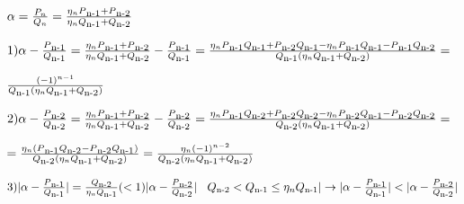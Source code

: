 \documentclass[12pt]{article}
\begin{document}
        $\alpha = \frac{P_n}{Q_n} = \frac{\eta_n P\textsubscript{n-1} + P\textsubscript{n-2}}{\eta_n Q\textsubscript{n-1} + Q\textsubscript{n-2}} \vspace{2 ex}$

$1) \alpha - \frac{P\textsubscript{n-1}}{Q\textsubscript{n-1}} = \frac{\eta_n P\textsubscript{n-1} + P\textsubscript{n-2}}{\eta_n Q\textsubscript{n-1} + Q\textsubscript{n-2}} - \frac{P\textsubscript{n-1}}{Q\textsubscript{n-1}}
        = \frac{\eta_n P\textsubscript{n-1} Q\textsubscript{n-1} + P\textsubscript{n-2} Q\textsubscript{n-1} - \eta_n P\textsubscript{n-1} Q\textsubscript{n-1} - P\textsubscript{n-1} Q\textsubscript{n-2}}{ Q\textsubscript{n-1}(\eta_n Q\textsubscript{n-1} + Q\textsubscript{n-2})} = \vspace{2 ex}$

$\frac{(-1)^{n-1}}{Q\textsubscript{n-1}(\eta_n Q\textsubscript{n-1} + Q\textsubscript{n-2})} \vspace{2 ex}$

$2) \alpha - \frac{P\textsubscript{n-2}}{Q\textsubscript{n-2}} = \frac{\eta_n P\textsubscript{n-1} + P\textsubscript{n-2}}{\eta_n Q\textsubscript{n-1} + Q\textsubscript{n-2}} - \frac{P\textsubscript{n-2}}{Q\textsubscript{n-2}}
        = \frac{\eta_n P\textsubscript{n-1} Q\textsubscript{n-2} + P\textsubscript{n-2} Q\textsubscript{n-2} - \eta_n P\textsubscript{n-2} Q\textsubscript{n-1} - P\textsubscript{n-2} Q\textsubscript{n-2}}{ Q\textsubscript{n-2}(\eta_n Q\textsubscript{n-1} + Q\textsubscript{n-2})} = \vspace{2 ex}$

$ = \frac{\eta_n (P\textsubscript{n-1} Q\textsubscript{n-2} - P\textsubscript{n-2} Q\textsubscript{n-1})}{Q\textsubscript{n-2}(\eta_n Q\textsubscript{n-1} + Q\textsubscript{n-2}) }
        = \frac{\eta_n (-1)^{n-2}}{Q\textsubscript{n-2}(\eta_n Q\textsubscript{n-1} + Q\textsubscript{n-2})}
        \vspace{2 ex}$

$ 3)
        |\alpha - \frac{P\textsubscript{n-1}}{Q\textsubscript{n-1}}| = \frac{Q\textsubscript{n-2}}{\eta_n Q\textsubscript{n-1}} (< 1) |\alpha - \frac{P\textsubscript{n-2}}{Q\textsubscript{n-2}}| \hspace{2 ex}
        Q\textsubscript{n-2} < Q\textsubscript{n-1} \leq \eta_n Q\textsubscript{n-1} |\rightarrow |\alpha - \frac{P\textsubscript{n-1}}{Q\textsubscript{n-1}}| < |\alpha - \frac{P\textsubscript{n-2}}{Q\textsubscript{n-2}}|
        \vspace{2 ex}$
\end{document}
